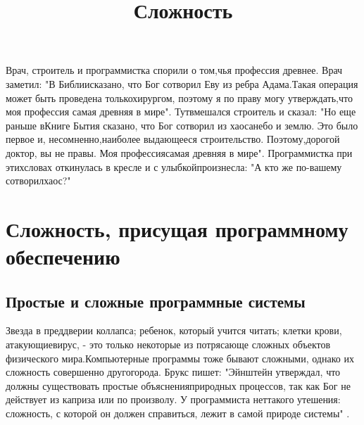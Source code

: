 \documentclass[11pt]{article}
\title{\bf Сложность}
\author{}
\date{}
\begin{document}
\maketitle
\thispagestyle{empty}
\begin{flushright}
\begin{minipage}{0.47\hsize}
\small
Врач, строитель и программистка спорили о том,\linebreak чья профессия древнее. Врач заметил: "В Библии\linebreak сказано, что Бог сотворил Еву из ребра Адама.\linebreak Такая операция может быть проведена только\linebreak хирургом, поэтому я по праву могу утверждать,\linebreak что моя профессия самая древняя в мире". Тут\linebreak вмешался строитель и сказал: "Но еще раньше в\linebreak Книге Бытия сказано, что Бог сотворил из хаоса\linebreak небо и землю. Это было первое и, несомненно,\linebreak наиболее выдающееся строительство. Поэтому,\linebreak дорогой доктор, вы не правы. Моя профессия\linebreak самая древняя в мире". Программистка при этих\linebreak словах откинулась в кресле и с улыбкой\linebreak произнесла: "А кто же по-вашему сотворил\linebreak хаос?"

\end{minipage}
\end{flushright}

\section{Сложность, присущая программному обеспечению }
\subsection{Простые и сложные программные системы }

Звезда в преддверии коллапса; ребенок, который учится читать; клетки крови, атакующие\linebreak вирус, - это только некоторые из потрясающе сложных объектов физического мира.\linebreak Компьютерные программы тоже бывают сложными, однако их сложность совершенно другого\linebreak рода. Брукс пишет: "Эйнштейн утверждал, что должны существовать простые объяснения\linebreak природных процессов, так как Бог не действует из каприза или по произволу. У программиста нет\linebreak такого утешения: сложность, с которой он должен справиться, лежит в самой природе системы" \cite{n1}.\bigskip
\end{document}

